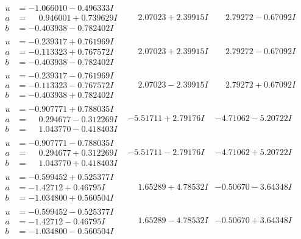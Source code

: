 \documentclass[1p]{elsarticle_modified}
\theoremstyle{definition}
\begin{document}
$$\begin{array}{c|c|c}
\begin{aligned}
u &= -1.066010 - 0.496333 I \\
a &= \phantom{-}0.946001 + 0.739629 I \\
b &= -0.403938 - 0.782402 I\end{aligned}
 & \phantom{-}2.07023 + 2.39915 I & \phantom{-}2.79272 - 0.67092 I \\ \hline\begin{aligned}
u &= -0.239317 + 0.761969 I \\
a &= -0.113323 + 0.767572 I \\
b &= -0.403938 - 0.782402 I\end{aligned}
 & \phantom{-}2.07023 + 2.39915 I & \phantom{-}2.79272 - 0.67092 I \\ \hline\begin{aligned}
u &= -0.239317 - 0.761969 I \\
a &= -0.113323 - 0.767572 I \\
b &= -0.403938 + 0.782402 I\end{aligned}
 & \phantom{-}2.07023 - 2.39915 I & \phantom{-}2.79272 + 0.67092 I \\ \hline\begin{aligned}
u &= -0.907771 + 0.788035 I \\
a &= \phantom{-}0.294677 - 0.312269 I \\
b &= \phantom{-}1.043770 - 0.418403 I\end{aligned}
 & -5.51711 + 2.79176 I & -4.71062 - 5.20722 I \\ \hline\begin{aligned}
u &= -0.907771 - 0.788035 I \\
a &= \phantom{-}0.294677 + 0.312269 I \\
b &= \phantom{-}1.043770 + 0.418403 I\end{aligned}
 & -5.51711 - 2.79176 I & -4.71062 + 5.20722 I \\ \hline\begin{aligned}
u &= -0.599452 + 0.525377 I \\
a &= -1.42712 + 0.46795 I \\
b &= -1.034800 + 0.560504 I\end{aligned}
 & \phantom{-}1.65289 + 4.78532 I & -0.50670 - 3.64348 I \\ \hline\begin{aligned}
u &= -0.599452 - 0.525377 I \\
a &= -1.42712 - 0.46795 I \\
b &= -1.034800 - 0.560504 I\end{aligned}
 & \phantom{-}1.65289 - 4.78532 I & -0.50670 + 3.64348 I \\ \hline\begin{aligned}

\end{aligned}
\end{array}$$
\end{document}
